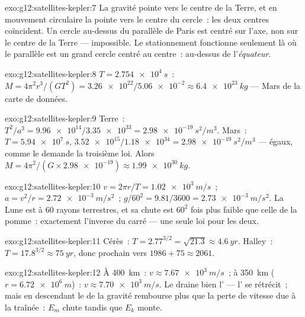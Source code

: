 \begin{solution}{exo:g12:satellites-kepler:7}
La gravité pointe vers le centre de la Terre, et en mouvement circulaire
la  pointe vers le centre du cercle~: les
deux centres coïncident. Un cercle au-dessus du parallèle de Paris est
centré sur l'axe, non sur le centre de la Terre --- impossible. Le
stationnement fonctionne seulement là où le parallèle est un
grand cercle centré au centre~: au-dessus de l'\emph{équateur}.
\end{solution}

\begin{solution}{exo:g12:satellites-kepler:8}
$T = \qty{2.754e4}{s}$~: $M = 4\pi^2 r^3/(GT^2) =
\num{3.26e22}/\num{5.06e-2} \approx \qty{6.4e23}{kg}$ --- Mars de la
carte de données.
\end{solution}

\begin{solution}{exo:g12:satellites-kepler:9}
Terre~: $T^2/a^3 = \num{9.96e14}/\num{3.35e33} =
\qty{2.98e-19}{s^2/m^3}$. Mars~: $T = \qty{5.94e7}{s}$,
$\num{3.52e15}/\num{1.18e34} = \qty{2.98e-19}{s^2/m^3}$ --- égaux, comme
le demande la troisième loi. Alors $M = 4\pi^2/(G \times \num{2.98e-19})
\approx \qty{1.99e30}{kg}$.
\end{solution}

\begin{solution}{exo:g12:satellites-kepler:10}
$v = 2\pi r/T = \qty{1.02e3}{m/s}$~; $a = v^2/r =
\qty{2.72e-3}{m/s^2}$~; $g/60^2 = 9.81/3600 = \qty{2.73e-3}{m/s^2}$.
La Lune est à $60$ rayons terrestres, et sa chute est $60^2$ fois plus
faible que celle de la pomme~: exactement l'inverse du carré --- une
seule loi pour les deux.
\end{solution}

\begin{solution}{exo:g12:satellites-kepler:11}
Cérès~: $T = 2.77^{3/2} = \sqrt{21.3} \approx \qty{4.6}{yr}$. Halley~:
$T = 17.8^{3/2} \approx \qty{75}{yr}$, donc prochain
 vers $1986 + 75 \approx 2061$.
\end{solution}

\begin{solution}{exo:g12:satellites-kepler:12}
À \qty{400}{km}~: $v \approx \qty{7.67e3}{m/s}$~; à \qty{350}{km}
($r = \qty{6.72e6}{m}$)~: $v \approx \qty{7.70e3}{m/s}$. Le
 draine bien l'
--- l' se rétrécit~; mais en descendant le
 de la gravité rembourse plus que la perte de
vitesse due à la traînée~: $E_m$ chute tandis que $E_k$ monte.
\end{solution}

